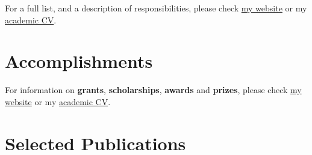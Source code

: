 \documentclass[11pt,a4paper,]{awesome-cv}
\begin{document}
For a full list, and a description of responsibilities, please check
\href{https://jdleongomez.info/en/profile/\#experience}{my website} or
my \href{https://jdleongomez.info/en/files/jdl_cv_en.pdf}{academic CV}.

\begin{cventries}
    \vspace{-4.0mm}
\end{cventries}

\section{Accomplishments}\label{accomplishments}

For information on \textbf{grants}, \textbf{scholarships},
\textbf{awards} and \textbf{prizes}, please check
\href{https://jdleongomez.info/en/profile/\#accomplishments}{my website}
or my \href{https://jdleongomez.info/en/files/jdl_cv_en.pdf}{academic
CV}.

\section{Selected Publications}\label{selected-publications}
\end{document}
